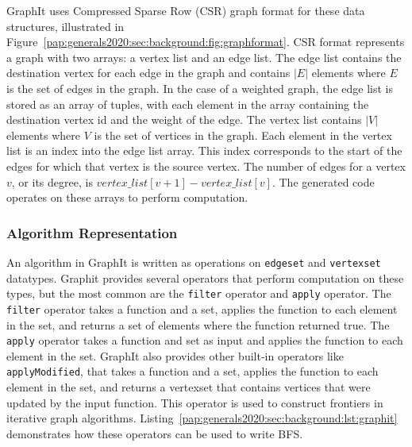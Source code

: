 GraphIt uses Compressed Sparse Row (CSR) graph format for these data structures, illustrated in Figure~\ref{pap:generals2020:sec:background:fig:graphformat}.
CSR format represents a graph with two arrays: a vertex list and an edge list.
The edge list contains the destination vertex for each edge in the graph and contains $|E|$ elements where $E$ is the set of edges in the graph.
In the case of a weighted graph, the edge list is stored as an array of tuples, with each element in the array containing the destination vertex id and the weight of the edge.
The vertex list contains $|V|$ elements where $V$ is the set of vertices in the graph. 
Each element in the vertex list is an index into the edge list array.
This index corresponds to the start of the edges for which that vertex is the source vertex.
The number of edges for a vertex $v$, or its degree, is $vertex\_list[v+1] - vertex\_list[v]$.
The generated code operates on these arrays to perform computation.

\graphformatfig


\subsubsection{Algorithm Representation}
An algorithm in GraphIt is written as operations on \lstinline[language=graphit]{edgeset} and \lstinline[language=graphit]{vertexset} datatypes. 
Graphit provides several operators that perform computation on these types, but the most common are the \lstinline[language=graphit]{filter} operator and \lstinline[language=graphit]{apply} operator.
The \lstinline[language=graphit]{filter} operator takes a function and a set, applies the function to each element in the set, and returns a set of elements where the function returned true.
The \lstinline[language=graphit]{apply} operator takes a function and set as input and applies the function to each element in the set. %
GraphIt also provides other built-in operators like \lstinline[language=graphit]{applyModified}, that takes a function and a set, applies the function to each element in the set, and returns a vertexset that contains vertices that were updated by the input function. 
This operator is used to construct frontiers in iterative graph algorithms. 
Listing~\ref{pap:generals2020:sec:background:lst:graphit} demonstrates how these operators can be used to write BFS.

